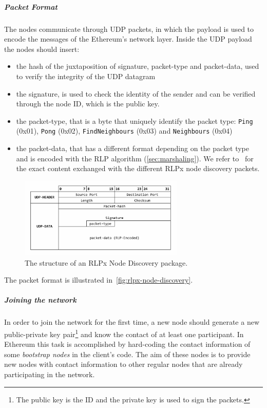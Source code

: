 \subparagraph{Packet Format}
The nodes communicate through UDP packets, in which the payload is used to
encode the messages of the Ethereum's network layer. Inside the UDP payload the
nodes should insert:
\begin{itemize}
    \item the hash of the juxtaposition of signature, packet-type and
    packet-data, used to verify the integrity of the UDP datagram
    \item the signature, is used to check the identity of the sender and can
    be verified through the node ID, which is the public key.
    \item the packet-type, that is a byte that uniquely identify the packet
    type: \texttt{Ping} (0x01), \texttt{Pong} (0x02), \texttt{FindNeighbours}
    (0x03) and \texttt{Neighbours} (0x04) ~\cite{bib:rlpx-discovery-protocol}
    \item the packet-data, that has a different format depending on the packet
    type and is encoded with the RLP algorithm (\autoref{sec:marshaling}).
    We refer to~\cite{bib:rlpx-discovery-protocol} for the exact content
    exchanged with the different RLPx node discovery packets.
\end{itemize}
\begin{figure}
    \begin{center}
    \includegraphics[width=0.7\textwidth]{./res/img/rlp-node-discovery-packet-format.pdf}
    \caption{The structure of an RLPx Node Discovery package.}
    \label{fig:rlpx-node-discovery}
    \end{center}
\end{figure}

The packet format is illustrated in~\autoref{fig:rlpx-node-discovery}.




\subparagraph{Joining the network}
In order to join the network for the first time, a new node should generate a
new public-private key pair\footnote{The public key is the ID and the private
key is used to sign the packets.} and know the contact of at least one
participant. In Ethereum this task is accomplished by hard-coding the contact
information of some \textit{bootstrap nodes} in the client's code. The aim of
these nodes is to provide new nodes with contact information to other regular
nodes that are already participating in the network.

